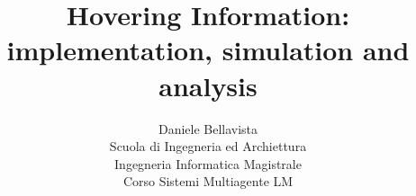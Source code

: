\documentclass[11pt]{article}
\begin{document}
\title{Hovering Information: implementation, simulation and analysis}
\author{Daniele Bellavista\\
Scuola di Ingegneria ed Archiettura\\
Ingegneria Informatica Magistrale\\
Corso Sistemi Multiagente LM\\
}

\maketitle



%


\nocite{*}
{}
\end{document}
